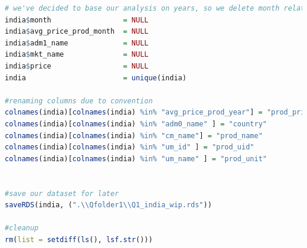 \documentclass[11pt]{article}
\begin{document}
\begin{lstlisting}[language= R]
# we've decided to base our analysis on years, so we delete month related columns and other columns we don'd need
india$month                 = NULL
india$avg_price_prod_month  = NULL
india$adm1_name             = NULL
india$mkt_name              = NULL
india$price                 = NULL
india                       = unique(india)

#renaming columns due to convention
colnames(india)[colnames(india) %in% "avg_price_prod_year"] = "prod_price"
colnames(india)[colnames(india) %in% "adm0_name" ] = "country"
colnames(india)[colnames(india) %in% "cm_name"] = "prod_name"
colnames(india)[colnames(india) %in% "um_id" ] = "prod_uid"
colnames(india)[colnames(india) %in% "um_name" ] = "prod_unit"


#save our dataset for later
saveRDS(india, (".\\Qfolder1\\Q1_india_wip.rds"))

#cleanup
rm(list = setdiff(ls(), lsf.str()))
\end{lstlisting}
\end{document}
